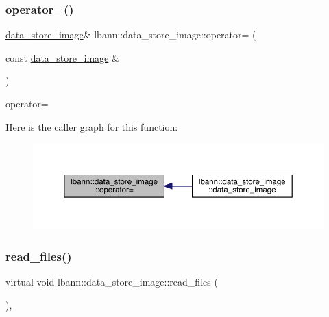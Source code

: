 \subsubsection{\texorpdfstring{operator=()}{operator=()}}
{\footnotesize\ttfamily \hyperlink{classlbann_1_1data__store__image}{data\+\_\+store\+\_\+image}\& lbann\+::data\+\_\+store\+\_\+image\+::operator= (\begin{DoxyParamCaption}\item[{const \hyperlink{classlbann_1_1data__store__image}{data\+\_\+store\+\_\+image} \&}]{ }\end{DoxyParamCaption})\hspace{0.3cm}{\ttfamily [default]}}



operator= 

Here is the caller graph for this function\+:\nopagebreak
\begin{figure}[H]
\begin{center}
\leavevmode
\includegraphics[width=350pt]{classlbann_1_1data__store__image_a997fd4f7961b173e1b03dfe1d81ad96f_icgraph}
\end{center}
\end{figure}
\mbox{\label{classlbann_1_1data__store__image_a146874a68c24213f5509efb9727cb6e5}} 
\subsubsection{\texorpdfstring{read\+\_\+files()}{read\_files()}}
{\footnotesize\ttfamily virtual void lbann\+::data\+\_\+store\+\_\+image\+::read\+\_\+files (\begin{DoxyParamCaption}{ }\end{DoxyParamCaption})\hspace{0.3cm}{\ttfamily [protected]}, {}}



